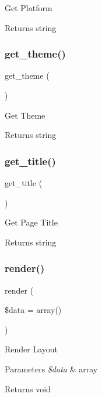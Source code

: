 Get Platform \begin{DoxyReturn}{Returns}
string 
\end{DoxyReturn}
\mbox{\label{class_template_ac5245cd48efa7a670263a0b11493bb70}} 
\subsubsection{\texorpdfstring{get\+\_\+theme()}{get\_theme()}}
{\footnotesize\ttfamily get\+\_\+theme (\begin{DoxyParamCaption}{ }\end{DoxyParamCaption})}

Get Theme \begin{DoxyReturn}{Returns}
string 
\end{DoxyReturn}
\mbox{\label{class_template_ac01f0421cdf853d8bdac45fcd181dc28}} 
\subsubsection{\texorpdfstring{get\+\_\+title()}{get\_title()}}
{\footnotesize\ttfamily get\+\_\+title (\begin{DoxyParamCaption}{ }\end{DoxyParamCaption})}

Get Page Title \begin{DoxyReturn}{Returns}
string 
\end{DoxyReturn}
\mbox{\label{class_template_a119fec25d9d429f9b9b467f7f67f039b}} 
\subsubsection{\texorpdfstring{render()}{render()}}
{\footnotesize\ttfamily render (\begin{DoxyParamCaption}\item[{}]{\$data = {\ttfamily array()} }\end{DoxyParamCaption})}

Render Layout 
\begin{DoxyParams}{Parameters}
{\em \$data} & array \\
\hline
\end{DoxyParams}
\begin{DoxyReturn}{Returns}
void 
\end{DoxyReturn}
\mbox{\label{class_template_a2d9a6541579ccdb6e3836b0d26fb0b16}} 
